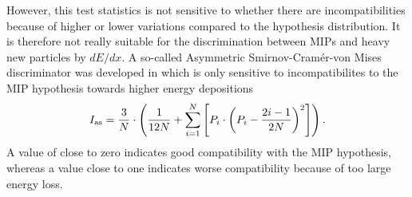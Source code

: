 However, this test statistics is not sensitive to whether there are incompatibilities because of higher or lower variations compared to the hypothesis distribution.
It is therefore not really suitable for the discrimination between MIPs and heavy new particles by $dE/dx$.
A so-called Asymmetric Smirnov-Cram\'{e}r-von Mises discriminator was developed in \cite{bib:Quertenmont_2010} which is only sensitive to incompatibilites to the MIP hypothesis towards higher energy depositions
\begin{equation*}
I_{\text{as}} = \frac{3}{N} \cdot \left( \frac{1}{12N} + \sum\limits_{i=1}^N \left[ P_i \cdot \left(P_i - \frac{2i-1}{2N} \right)^2 \right] \right).
\end{equation*}
A value of \ias close to zero indicates good compatibility with the MIP hypothesis, whereas a value close to one indicates worse compatibility because of too large energy loss.

